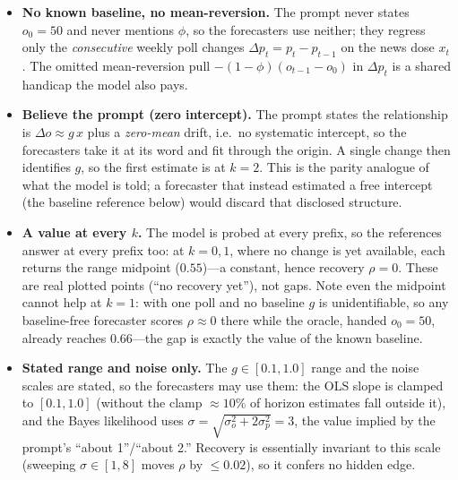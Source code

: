 \documentclass{article} %
\begin{document}
\begin{itemize}
\item \textbf{No known baseline, no mean-reversion.}  The prompt never states $o_0{=}50$ and never
mentions $\phi$, so the forecasters use neither; they regress only the \emph{consecutive} weekly
poll changes $\Delta p_t = p_t - p_{t-1}$ on the news dose $x_t$.  The omitted mean-reversion pull
$-(1-\phi)(o_{t-1}-o_0)$ in $\Delta p_t$ is a shared handicap the model also pays.
\item \textbf{Believe the prompt (zero intercept).}  The prompt states the relationship is
$\Delta o\approx g\,x$ plus a \emph{zero-mean} drift, i.e.\ no systematic intercept, so the
forecasters take it at its word and fit through the origin.  A single change then identifies $g$, so
the first estimate is at $k{=}2$.  This is the parity analogue of what the model is told; a
forecaster that instead estimated a free intercept (the baseline reference below) would discard that
disclosed structure.
\item \textbf{A value at every $k$.}  The model is probed at every prefix, so the references answer
at every prefix too: at $k=0,1$, where no change is yet available, each returns the range midpoint
($0.55$)---a constant, hence recovery $\rho=0$.  These are real plotted points (``no recovery yet''),
not gaps.  Note even the midpoint cannot help at $k{=}1$: with one poll and no baseline $g$ is
unidentifiable, so any baseline-free forecaster scores $\rho\approx0$ there while the oracle, handed
$o_0{=}50$, already reaches $0.66$---the gap is exactly the value of the known baseline.
\item \textbf{Stated range and noise only.}  The $g\in[0.1,1.0]$ range and the noise scales are
stated, so the forecasters may use them: the OLS slope is clamped to $[0.1,1.0]$ (without the clamp
$\approx10\%$ of horizon estimates fall outside it), and the Bayes likelihood uses
$\sigma=\sqrt{\sigma_o^2+2\sigma_p^2}=3$, the value implied by the prompt's ``about 1''/``about
2.''  Recovery is essentially invariant to this scale (sweeping $\sigma\in[1,8]$ moves $\rho$ by
$\leq0.02$), so it confers no hidden edge.
\end{itemize}
\end{document}
